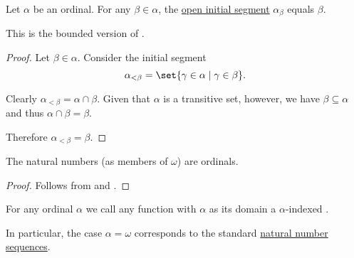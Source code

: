 \begin{proposition}\label{thm:initial_segment_of_ordinal}
  Let \( \alpha \) be an ordinal. For any \( \beta \in \alpha \), the \hyperref[def:partially_ordered_set_interval/ray]{open initial segment} \( \alpha_\beta \) equals \( \beta \).

  This is the bounded version of .
\end{proposition}
\begin{proof}
  Let \( \beta \in \alpha \). Consider the initial segment
  \begin{equation*}
    \alpha_{<\beta} = \set{ \gamma \in \alpha \given \gamma \in \beta }.
  \end{equation*}

  Clearly \( \alpha_{<\beta} = \alpha \cap \beta \). Given that \( \alpha \) is a transitive set, however, we have \( \beta \subseteq \alpha \) and thus \( \alpha \cap \beta = \beta \).

  Therefore \( \alpha_{<\beta} = \beta \).
\end{proof}

\begin{corollary}\label{thm:natural_numbers_are_ordinals}
  The natural numbers (as members of \hyperref[thm:smallest_inductive_set_existence]{\( \omega \)}) are ordinals.
\end{corollary}
\begin{proof}
  Follows from  and .
\end{proof}

\begin{definition}\label{def:transfinite_sequence}
  For any ordinal \( \alpha \) we call any function with \( \alpha \) as its domain a \( \alpha \)-indexed .

  In particular, the case \( \alpha = \omega \) corresponds to the standard \hyperref[def:natural_sequence]{natural number sequences}.
\end{definition}

